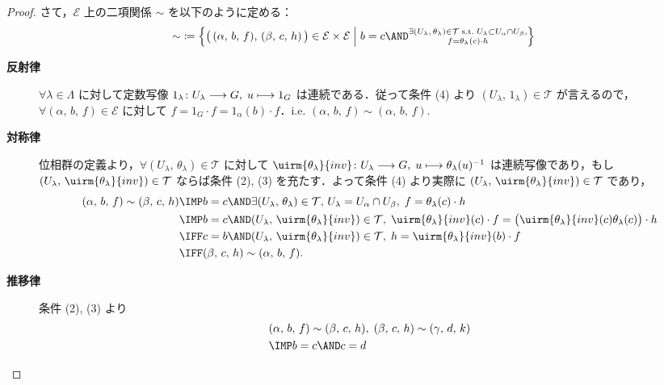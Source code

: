 \documentclass[algtopo_main]{subfiles}
\begin{document}
\begin{proof}
	さて，$\mathcal{E}$ 上の二項関係 $\sim$ を以下のように定める：
	\begin{align}
		\label{eq.prop9-1_equiv}
		\sim\; \coloneqq \Bigl\{ \bigl( \, (\alpha,\, b,\, f),\, (\beta,\, c,\, h)\, \bigr) \in \mathcal{E} \times \mathcal{E} \Bigm| b=c \AND \substack{\exists (U_\lambda,\, \theta_\lambda) \in \mathcal{T}\; \mathrm{s.t.}\; U_\lambda \subset U_\alpha \cap U_\beta,\\ f = \theta_\lambda(c) \cdot h} \Bigr\} 
	\end{align}
    \begin{description}
        \item[\textbf{反射律}] $\forall \lambda \in \Lambda$ に対して定数写像 $1_\lambda \colon U_\lambda \longrightarrow G,\; u \longmapsto 1_G$ は連続である．従って条件 (4) より $(U_\lambda,\, 1_\lambda) \in \mathcal{T}$ が言えるので，$\forall (\alpha,\, b,\, f) \in \mathcal{E}$ に対して $f = 1_G \cdot f = 1_\alpha (b) \cdot f$．i.e. $(\alpha,\, b,\, f) \sim (\alpha,\, b,\, f).$
        \item[\textbf{対称律}] 位相群の定義より，$\forall (U_\lambda,\, \theta_\lambda) \in \mathcal{T}$ に対して $\uirm{\theta_\lambda}{inv} \colon U_\lambda \lto G,\; u \lmto \theta_\lambda(u)^{-1}$ は連続写像であり，もし $(U_\lambda,\, \uirm{\theta_\lambda}{inv}) \in \mathcal{T}$ ならば条件 (2), (3) を充たす．よって条件 (4) より実際に $(U_\lambda,\, \uirm{\theta_\lambda}{inv}) \in \mathcal{T}$ であり，
        \begin{align}
            (\alpha,\, b,\, f) \sim (\beta,\, c,\, h) &\IMP b=c \AND \exists (U_\lambda,\, \theta_\lambda) \in \mathcal{T},\, U_\lambda = U_\alpha \cap U_\beta,\; f = \theta_{\lambda}(c) \cdot h \\
            &\IMP b=c \AND (U_\lambda,\, \uirm{\theta_\lambda}{inv}) \in \mathcal{T},\; \uirm{\theta_\lambda}{inv}(c) \cdot f = \bigl(\uirm{\theta_\lambda}{inv}(c) \theta_\lambda(c) \bigr) \cdot h \\
            &\IFF c=b \AND (U_\lambda,\, \uirm{\theta_\lambda}{inv}) \in \mathcal{T},\; h = \uirm{\theta_\lambda}{inv}(b) \cdot f \\
            &\IFF (\beta,\, c,\, h) \sim (\alpha,\, b,\, f).
        \end{align}
        \item[\textbf{推移律}] 条件 (2), (3) より
        \begin{align}
            &(\alpha,\, b,\, f) \sim (\beta,\, c,\, h),\; (\beta,\, c,\, h) \sim (\gamma,\, d,\, k) \\
            &\IMP b = c \AND c = d \\ 

\end{align}
\end{description}
\end{proof}
\end{document}
